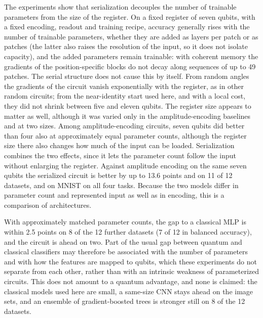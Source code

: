 \documentclass[11pt]{article}
\begin{document}
The experiments show that serialization decouples the number of trainable parameters from the size of the register. On a fixed register of seven qubits, with a fixed encoding, readout and training recipe, accuracy generally rises with the number of trainable parameters, whether they are added as layers per patch or as patches (the latter also raises the resolution of the input, so it does not isolate capacity), and the added parameters remain trainable: with coherent memory the gradients of the position-specific blocks do not decay along sequences of up to 49 patches. The serial structure does not cause this by itself. From random angles the gradients of the circuit vanish exponentially with the register, as in other random circuits; from the near-identity start used here, and with a local cost, they did not shrink between five and eleven qubits. The register size appears to matter as well, although it was varied only in the amplitude-encoding baselines and at two sizes. Among amplitude-encoding circuits, seven qubits did better than four also at approximately equal parameter counts, although the register size there also changes how much of the input can be loaded. Serialization combines the two effects, since it lets the parameter count follow the input without enlarging the register. Against amplitude encoding on the same seven qubits the serialized circuit is better by up to 13.6 points and on 11 of 12 datasets, and on MNIST on all four tasks. Because the two models differ in parameter count and represented input as well as in encoding, this is a comparison of architectures.

With approximately matched parameter counts, the gap to a classical MLP is within 2.5 points on 8 of the 12 further datasets (7 of 12 in balanced accuracy), and the circuit is ahead on two. Part of the usual gap between quantum and classical classifiers may therefore be associated with the number of parameters and with how the features are mapped to qubits, which these experiments do not separate from each other, rather than with an intrinsic weakness of parameterized circuits. This does not amount to a quantum advantage, and none is claimed: the classical models used here are small, a same-size CNN stays ahead on the image sets, and an ensemble of gradient-boosted trees is stronger still on 8 of the 12 datasets.
\end{document}
